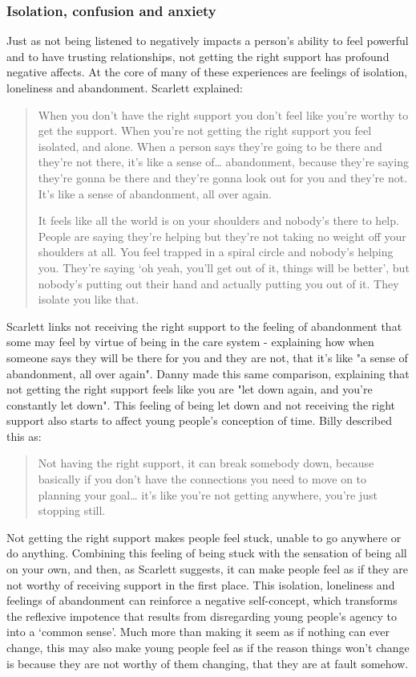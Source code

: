\subsubsection{Isolation, confusion and anxiety}
Just as not being listened to negatively impacts a person's ability to feel powerful and to have trusting relationships, not getting the right support has profound negative affects. At the core of many of these experiences are feelings of isolation, loneliness and abandonment. Scarlett explained:
\begin{quote}
When you don’t have the right support you don’t feel like you’re worthy to get the support. When you’re not getting the right support you feel isolated, and alone. When a person says they’re going to be there and they’re not there, it’s like a sense of… abandonment, because they’re saying they’re gonna be there and they’re gonna look out for you and they’re not. It’s like a sense of abandonment, all over again. 

It feels like all the world is on your shoulders and nobody’s there to help. People are saying they’re helping but they’re not taking no weight off your shoulders at all. You feel trapped in a spiral circle and nobody’s helping you. They’re saying ‘oh yeah, you’ll get out of it, things will be better’, but nobody’s putting out their hand and actually putting you out of it. They isolate you like that.
\end{quote}
Scarlett links not receiving the right support to the feeling of abandonment that some may feel by virtue of being in the care system - explaining how when someone says they will be there for you and they are not, that it's like "a sense of abandonment, all over again". Danny made this same comparison, explaining that not getting the right support feels like you are "let down again, and you're constantly let down". This feeling of being let down and not receiving the right support also starts to affect young people’s conception of time. Billy described this as:
\begin{quote}
Not having the right support, it can break somebody down, because basically if you don’t have the connections you need to move on to planning your goal… it’s like you’re not getting anywhere, you’re just stopping still.
\end{quote}
Not getting the right support makes people feel stuck, unable to go anywhere or do anything. Combining this feeling of being stuck with the sensation of being all on your own, and then, as Scarlett suggests, it can make people feel as if they are not worthy of receiving support in the first place. This isolation, loneliness and feelings of abandonment can reinforce a negative self-concept, which transforms the reflexive impotence that results from disregarding young people’s agency to into a ‘common sense’. Much more than making it seem as if nothing can ever change, this may also make young people feel as if the reason things won’t change is because they are not worthy of them changing, that they are at fault somehow. 

